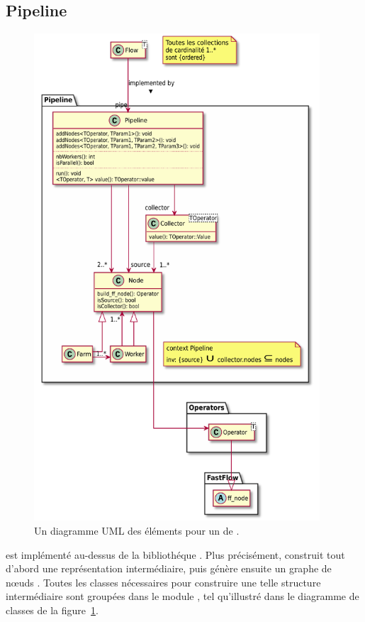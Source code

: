\subsection{Pipeline}

\begin{figure}
\centering
         \includegraphics[width=0.95\textwidth]{Figures/pipeline.pdf}
      \caption{Un diagramme UML des éléments pour un  de \ppff.}
       \label{pipeline.fig}
\end{figure}

 est impl\'ement\'e au-dessus de la biblioth\'eque . Plus précisément,  construit tout d'abord une repr\'esentation interm\'ediaire, puis g\'en\`ere ensuite un graphe de n\oe{}uds . Toutes les classes n\'ecessaires pour construire une telle structure interm\'ediaire sont group\'ees dans le module , tel qu'illustr\'e dans le diagramme de classes de la figure~\ref{pipeline.fig}.


